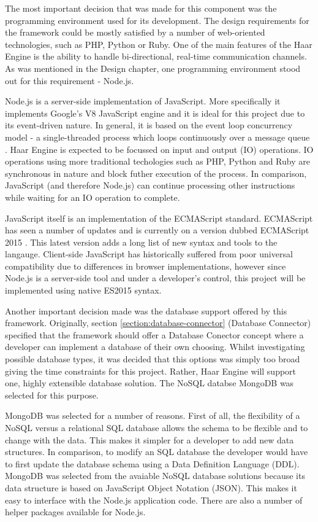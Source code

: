     The most important decision that was made for this component was the programming environment used for its development. The design requirements for the framework could be mostly satisfied by a number of web-oriented technologies, such as PHP, Python or Ruby. One of the main features of the Haar Engine is the ability to handle bi-directional, real-time communication channels. As was mentioned in the Design chapter, one programming environment stood out for this requirement - Node.js.

    Node.js is a server-side implementation of JavaScript. More specifically it implements Google's V8 JavaScript engine and it is ideal for this project due to its event-driven nature. In general, it is based on the event loop concurrency model - a single-threaded process which loops continuously over a message queue \citep{event-loop}. Haar Engine is expected to be focussed on input and output (IO) operations. IO operations using more traditional techologies such as PHP, Python and Ruby are synchronous in nature and block futher execution of the process. In comparison, JavaScript (and therefore Node.js) can continue processing other instructions while waiting for an IO operation to complete.

    JavaScript itself is an implementation of the ECMAScript standard. ECMAScript has seen a number of updates and is currently on a version dubbed ECMAScript 2015 \citep{es2015}. This latest version adds a long list of new syntax and tools to the langauge. Client-side JavaScript has historically suffered from poor universal compatibility due to differences in browser implementations, however since Node.js is a server-side tool and under a developer's control, this project will be implemented using native ES2015 syntax.

    Another important decision made was the database support offered by this framework. Originally, section \ref{section:database-connector} (Database Connector) specified that the framework should offer a Database Conector concept where a developer can implement a database of their own choosing. Whilst investigating possible database types, it was decided that this options was simply too broad giving the time constraints for this project. Rather, Haar Engine will support one, highly extensible database solution. The NoSQL databse MongoDB was selected for this purpose.

    MongoDB was selected for a number of reasons. First of all, the flexibility of a NoSQL versus a relational SQL database allows the schema to be flexible and to change with the data. This makes it simpler for a developer to add new data structures. In comparison, to modify an SQL database the developer would have to first update the database schema using a Data Definition Language (DDL). MongoDB was selected from the avaiable NoSQL database solutions because its data structure is based on JavaScript Object Notation (JSON). This makes it easy to interface with the Node.js application code. There are also a number of helper packages available for Node.js.

